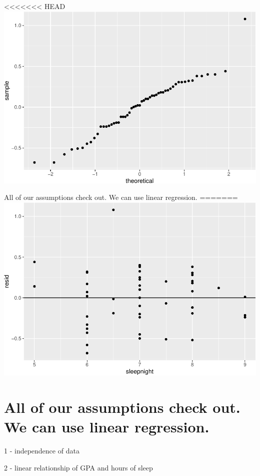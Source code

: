 \documentclass[]{article}
\begin{document}
<<<<<<< HEAD
\includegraphics{lab-8-regression_files/figure-latex/unnamed-chunk-9-1.pdf}

All of our assumptions check out. We can use linear regression.
=======
\includegraphics{lab-8-regression_files/figure-latex/unnamed-chunk-10-1.pdf}

\hypertarget{all-of-our-assumptions-check-out.-we-can-use-linear-regression.}{%
\section{All of our assumptions check out. We can use linear
regression.}\label{all-of-our-assumptions-check-out.-we-can-use-linear-regression.}}

1 - independence of data

2 - linear relationship of GPA and hours of sleep
\end{document}
